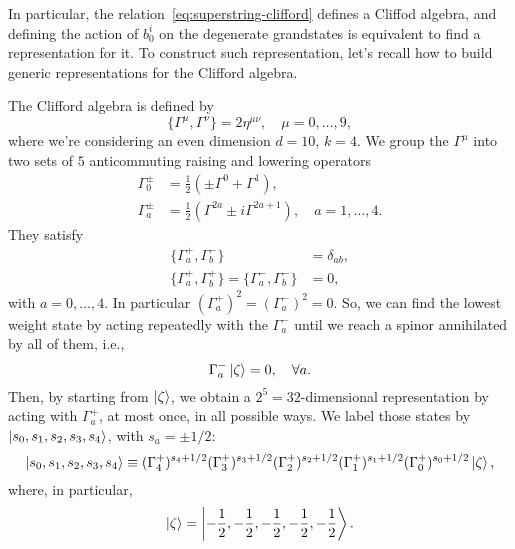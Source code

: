 In particular, the relation~\eqref{eq:superstring-clifford} defines a Cliffod algebra, and defining the action of $b^i_0$ on the degenerate grandstates is equivalent to find a representation for it. To construct such representation, let's recall how to build generic representations for the Clifford algebra.

\begin{mdframed}
The Clifford algebra is defined by
\begin{equation}\label{eq:clifford}
    \{ \Gamma^\mu, \Gamma^\nu \} = 2 \eta^{\mu\nu} , \quad \mu = 0, \dots, 9,
\end{equation}
where we're considering an even dimension $d = 10$, $k=4$. We group the $\Gamma^\mu$ into two sets of $5$ anticommuting raising and lowering operators
\begin{subequations}
\begin{align}
    \Gamma^\pm_0 &= \frac{1}{2} (\pm \Gamma^0 + \Gamma^1), \label{eq:gamma-zero-pm}\\
    \Gamma^\pm_a &= \frac{1}{2}(\Gamma^{2a} \pm i \Gamma^{2a+1}), \quad a = 1, \dots, 4 .\label{eq:gamma-a-pm}
\end{align}
\end{subequations}
They satisfy
\begin{subequations}
\begin{align}
    \{ \Gamma^+_a, \Gamma^-_b \} &= \delta_{ab} , \\
    \{ \Gamma^+_a, \Gamma^+_b \} = \{ \Gamma^-_a, \Gamma^-_b \} &= 0 ,
\end{align}
\end{subequations}
with $a = 0, \dots, 4$. In particular $(\Gamma^+_a)^2=(\Gamma^-_a)^2=0$. So, we can find the lowest weight state by acting repeatedly with the $\Gamma^-_a$ until we reach a spinor annihilated by all of them, i.e.,
\begin{equation}
    \Gamma^-_a \ket{\zeta} = 0, \quad \forall a .
\end{equation}
Then, by starting from $\ket{\zeta}$, we obtain a $2^5 = 32$-dimensional representation by acting with $\Gamma^+_a$, at most once, in all possible ways. We label those states by $\ket{s_0,s_1,s_2,s_3,s_4}$, with $s_a = \pm 1/2$:
\begin{equation}
    \ket{s_0,s_1,s_2,s_3,s_4} \equiv (\Gamma^+_4)^{s_4 + 1/2} (\Gamma^+_3)^{s_3 + 1/2} (\Gamma^+_2)^{s_2 + 1/2} (\Gamma^+_1)^{s_1 + 1/2} (\Gamma^+_0)^{s_0 + 1/2} \ket{\zeta},
\end{equation}
where, in particular,
\begin{equation}
    \ket{\zeta} = \ket{-\frac{1}{2},-\frac{1}{2},-\frac{1}{2},-\frac{1}{2},-\frac{1}{2}}.
\end{equation}


\end{mdframed}
